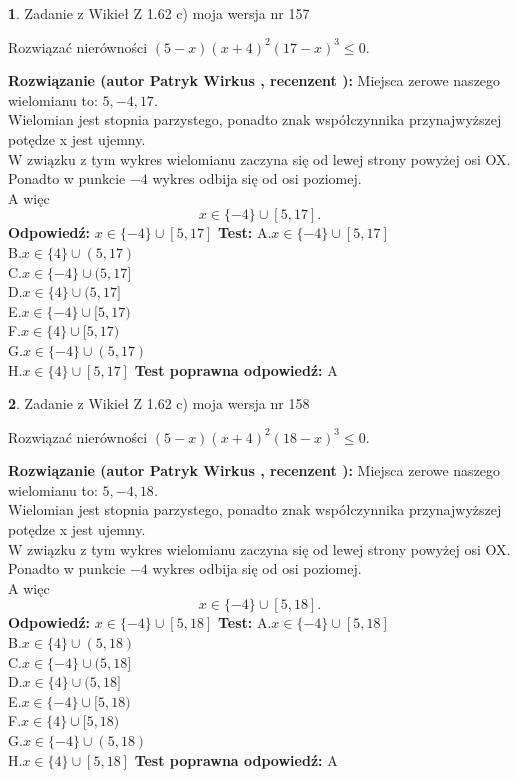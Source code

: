 \documentclass[12pt, a4paper]{article}
\theoremstyle{definition} %
\newtheorem{zad}{}
\newcommand{\zadStart}[1]{\begin{zad}#1\newline}
\newcommand{\zadStop}{\end{zad}}
\newcommand{\rozwStart}[2]{\noindent \textbf{Rozwiązanie (autor #1 , recenzent #2): }\newline}
\newcommand{\rozwStop}{\newline}
\newcommand{\odpStart}{\noindent \textbf{Odpowiedź:}\newline}
\newcommand{\odpStop}{\newline}
\newcommand{\testStart}{\noindent \textbf{Test:}\newline}
\newcommand{\testStop}{\newline}
\newcommand{\kluczStart}{\noindent \textbf{Test poprawna odpowiedź:}\newline}
\newcommand{\kluczStop}{\newline}
\begin{document}
\zadStart{Zadanie z Wikieł Z 1.62 c) moja wersja nr 157}

Rozwiązać nierówności $(5-x)(x+4)^{2}(17-x)^{3}\le0$.
\zadStop
\rozwStart{Patryk Wirkus}{}
Miejsca zerowe naszego wielomianu to: $5, -4, 17$.\\
Wielomian jest stopnia parzystego, ponadto znak współczynnika przy\linebreak najwyższej potędze x jest ujemny.\\ W związku z tym wykres wielomianu zaczyna się od lewej strony powyżej osi OX.\\
Ponadto w punkcie $-4$ wykres odbija się od osi poziomej.\\
A więc $$x \in \{-4\} \cup [5,17].$$
\rozwStop
\odpStart
$x \in \{-4\} \cup [5,17]$
\odpStop
\testStart
A.$x \in \{-4\} \cup [5,17]$\\
B.$x \in \{4\} \cup (5,17)$\\
C.$x \in \{-4\} \cup (5,17]$\\
D.$x \in \{4\} \cup (5,17]$\\
E.$x \in \{-4\} \cup [5,17)$\\
F.$x \in \{4\} \cup [5,17)$\\
G.$x \in \{-4\} \cup (5,17)$\\
H.$x \in \{4\} \cup [5,17]$
\testStop
\kluczStart
A
\kluczStop



\zadStart{Zadanie z Wikieł Z 1.62 c) moja wersja nr 158}

Rozwiązać nierówności $(5-x)(x+4)^{2}(18-x)^{3}\le0$.
\zadStop
\rozwStart{Patryk Wirkus}{}
Miejsca zerowe naszego wielomianu to: $5, -4, 18$.\\
Wielomian jest stopnia parzystego, ponadto znak współczynnika przy\linebreak najwyższej potędze x jest ujemny.\\ W związku z tym wykres wielomianu zaczyna się od lewej strony powyżej osi OX.\\
Ponadto w punkcie $-4$ wykres odbija się od osi poziomej.\\
A więc $$x \in \{-4\} \cup [5,18].$$
\rozwStop
\odpStart
$x \in \{-4\} \cup [5,18]$
\odpStop
\testStart
A.$x \in \{-4\} \cup [5,18]$\\
B.$x \in \{4\} \cup (5,18)$\\
C.$x \in \{-4\} \cup (5,18]$\\
D.$x \in \{4\} \cup (5,18]$\\
E.$x \in \{-4\} \cup [5,18)$\\
F.$x \in \{4\} \cup [5,18)$\\
G.$x \in \{-4\} \cup (5,18)$\\
H.$x \in \{4\} \cup [5,18]$
\testStop
\kluczStart
A
\kluczStop
\end{document}
